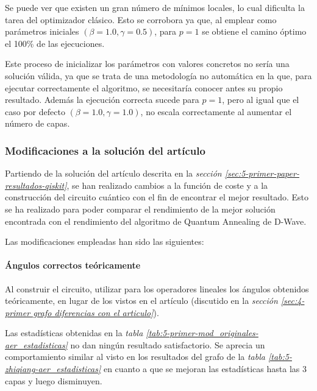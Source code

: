 Se puede ver que existen un gran número de mínimos locales, lo cual dificulta la tarea del optimizador clásico. Esto se corrobora ya que, al emplear como parámetros iniciales $(\beta = 1.0, \gamma = 0.5)$, para $p = 1$ se obtiene el camino óptimo el 100\% de las ejecuciones.

Este proceso de inicializar los parámetros con valores concretos no sería una solución válida, ya que se trata de una metodología no automática en la que, para ejecutar correctamente el algoritmo, se necesitaría conocer antes su propio resultado. Además la ejecución correcta sucede para $p = 1$, pero al igual que el caso por defecto $(\beta = 1.0, \gamma = 1.0)$, no escala correctamente al aumentar el número de capas.

\subsubsection{Modificaciones a la solución del artículo}
Partiendo de la solución del artículo descrita en la \textit{sección \ref{sec:5-primer-paper-resultados-qiskit}}, se han realizado cambios a la función de coste y a la construcción del circuito cuántico con el fin de encontrar el mejor resultado. Esto se ha realizado para poder comparar el rendimiento de la mejor solución encontrada con el rendimiento del algoritmo de Quantum Annealing de D-Wave.

Las modificaciones empleadas han sido las siguientes:

\paragraph{Ángulos correctos teóricamente}
Al construir el circuito, utilizar para los operadores lineales los ángulos obtenidos teóricamente, en lugar de los vistos en el artículo (discutido en la \textit{sección \ref{sec:4-primer grafo diferencias con el articulo}}).

Las estadísticas obtenidas en la \textit{tabla \ref{tab:5-primer-mod_originales-aer_estadisticas}} no dan ningún resultado satisfactorio.
Se aprecia un comportamiento similar al visto en los resultados del grafo de la \textit{tabla \ref{tab:5-zhiqiang-aer_estadisticas}} en cuanto a que se mejoran las estadísticas hasta las 3 capas y luego disminuyen.

